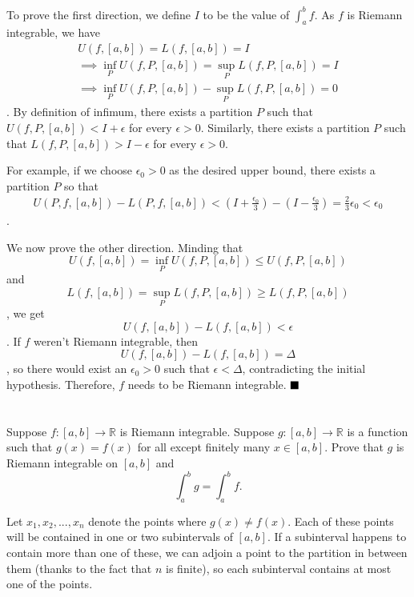 \documentclass[11pt, a4paper, tikz]{article}
\newcommand{\centsection}[1]{
	\section*{\centering{#1}}
}
\renewcommand{\qed}{\hfill\blacksquare}
\newcommand{\reals}{
	\ensuremath{\mathbb{R}}
}
\begin{document}
	To prove the first direction, we define $I$ to be the value of $\int_{a}^{b}f$. As $f$ is Riemann integrable, we have \begin{align*}
		U(f,[a,b])=L(f,[a,b])=I\\
		\implies\inf_PU(f,P,[a,b])=\sup_PL(f,P,[a,b])=I\\ \implies\inf_PU(f,P,[a,b])-\sup_PL(f,P,[a,b])=0
	\end{align*}.
	By definition of infimum, there exists a partition $P$ such that $U(f,P,[a,b])< I+\epsilon$ for every $\epsilon>0$. Similarly, there exists a partition $P$ such that $L(f,P,[a,b])>I-\epsilon$ for every $\epsilon>0$.
	
	For example, if we choose $\epsilon_0>0$ as the desired upper bound, there exists a partition $P$ so that
	\begin{align*}
		U(P,f,[a,b])-L(P,f,[a,b])<(I+\frac{\epsilon_0}{3})-(I-\frac{\epsilon_0}{3})=\frac{2}{3}\epsilon_0 < \epsilon_0
	\end{align*}.
	
	We now prove the other direction. Minding that \[U(f,[a,b])=\inf_PU(f,P,[a,b])\leq U(f,P,[a,b])\] and \[L(f,[a,b])=\sup_PL(f,P,[a,b])\geq L(f,P,[a,b])\], we get \[U(f,[a,b])-L(f,[a,b])<\epsilon\]. If $f$ weren't Riemann integrable, then \[U(f,[a,b])-L(f,[a,b])=\Delta\], so there would exist an $\epsilon_0>0$ such that $\epsilon<\Delta$, contradicting the initial hypothesis. Therefore, $f$ needs to be Riemann integrable.
	$\qed$
	
	\centsection{Exercise 6}
	
	\begin{formulationBox}
		Suppose $f:[a,b]\rightarrow\reals$ is Riemann integrable. Suppose $g:[a,b]\rightarrow\reals$ is a function such that $g(x) = f(x)$ for all except finitely many $x\in[a,b]$. Prove that $g$ is Riemann integrable on $[a,b]$ and \[\int_a^bg=\int_a^bf.\]
	\end{formulationBox}

	Let $x_1, x_2, ..., x_n$ denote the points where $g(x)\neq f(x)$. Each of these points will be contained in one or two subintervals of $[a,b]$. If a subinterval happens to contain more than one of these, we can adjoin a point to the partition in between them (thanks to the fact that $n$ is finite), so each subinterval contains at most one of the points.
	
\end{document}
